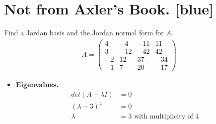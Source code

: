 \documentclass[12pt, letterpaper]{scrartcl}
\begin{document}
\section*{Not from Axler's Book. \xrfill[2pt]{3pt}[blue]}
{\color{violet}
Find a Jordan basis and the Jordan normal form for $A$.
\begin{align*}
     A=
     \left(
     \begin{array}{cccc}
          4&-4&-11&11\\
          3&-12&-42&42\\
          -2&12&37&-34\\
          -1&7&20&-17
     \end{array}
     \right)
\end{align*}
}
\begin{itemize}
    \item \textbf{Eigenvalues.}
    \begin{align*}
        det(A-\lambda I)&=0\\
        (\lambda-3)^4&=0\\
        \lambda&=3 \text{ with multiplicity of 4}
    \end{align*}


\end{itemize}
\end{document}
